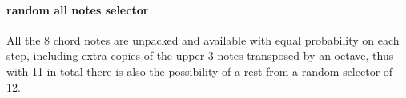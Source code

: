 \paragraph{random all notes selector}
All the 8 chord notes are unpacked and available with equal
probability on each step, including extra copies
of the upper 3 notes transposed by an octave, thus with 11
in total there is also the possibility of a rest from
a random selector of 12.